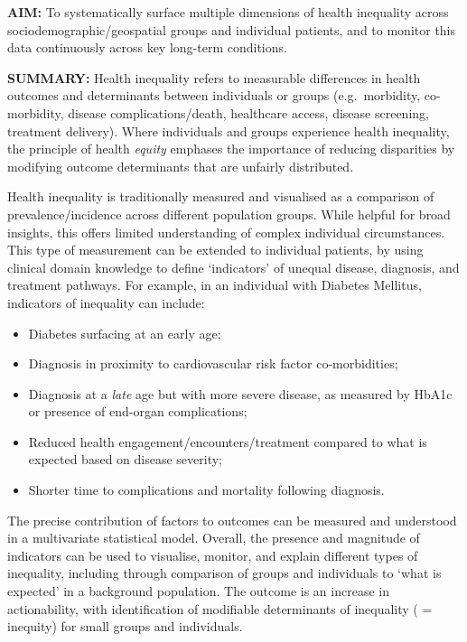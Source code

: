 \documentclass[
  letterpaper,
  DIV=11,
  numbers=noendperiod]{scrartcl}
\providecommand{\tightlist}{%
  \setlength{\itemsep}{0pt}\setlength{\parskip}{0pt}}\usepackage{longtable,booktabs,array}
\begin{document}
\textbf{AIM:} To systematically surface multiple dimensions of health
inequality across sociodemographic/geospatial groups and individual
patients, and to monitor this data continuously across key long-term
conditions.

\textbf{SUMMARY:} Health inequality refers to measurable differences in
health outcomes and determinants between individuals or groups
(e.g.~morbidity, co-morbidity, disease complications/death, healthcare
access, disease screening, treatment delivery). Where individuals and
groups experience health inequality, the principle of health
\emph{equity} emphases the importance of reducing disparities by
modifying outcome determinants that are unfairly distributed.

Health inequality is traditionally measured and visualised as a
comparison of prevalence/incidence across different population groups.
While helpful for broad insights, this offers limited understanding of
complex individual circumstances. This type of measurement can be
extended to individual patients, by using clinical domain knowledge to
define `indicators' of unequal disease, diagnosis, and treatment
pathways. For example, in an individual with Diabetes Mellitus,
indicators of inequality can include:

\begin{itemize}
\tightlist
\item
  Diabetes surfacing at an early age;
\item
  Diagnosis in proximity to cardiovascular risk factor co-morbidities;
\item
  Diagnosis at a \emph{late} age but with more severe disease, as
  measured by HbA1c or presence of end-organ complications;
\item
  Reduced health engagement/encounters/treatment compared to what is
  expected based on disease severity;
\item
  Shorter time to complications and mortality following diagnosis.
\end{itemize}

The precise contribution of factors to outcomes can be measured and
understood in a multivariate statistical model. Overall, the presence
and magnitude of indicators can be used to visualise, monitor, and
explain different types of inequality, including through comparison of
groups and individuals to `what is expected' in a background population.
The outcome is an increase in actionability, with identification of
modifiable determinants of inequality ( = inequity) for small groups and
individuals.
\end{document}
